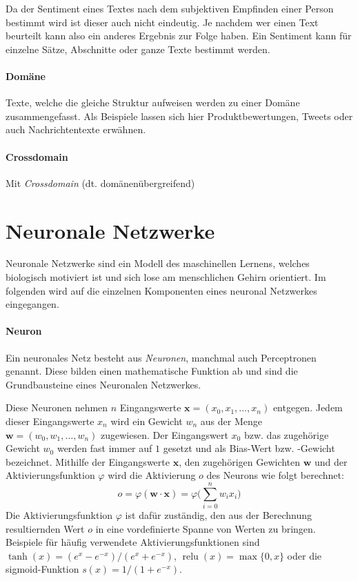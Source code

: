 Da der Sentiment eines Textes nach dem subjektiven Empfinden einer Person bestimmt wird ist dieser auch nicht eindeutig. Je nachdem wer einen Text beurteilt kann also ein anderes Ergebnis zur Folge haben. Ein Sentiment kann für einzelne Sätze, Abschnitte oder ganze Texte bestimmt werden.


\paragraph{Domäne} Texte, welche die gleiche Struktur aufweisen werden zu einer Domäne zusammengefasst. Als Beispiele lassen sich hier Produktbewertungen, Tweets oder auch Nachrichtentexte erwähnen.

\paragraph{Crossdomain} 
Mit \emph{Crossdomain} (dt. domänenübergreifend) 

\section{Neuronale Netzwerke}
\label{basics:neural_network}

Neuronale Netzwerke sind ein Modell des maschinellen Lernens, welches biologisch motiviert ist und sich lose am menschlichen Gehirn orientiert. Im folgenden wird auf die einzelnen Komponenten eines neuronal Netzwerkes eingegangen.

\paragraph{Neuron}\label{basic:neural_network:neuron} Ein neuronales Netz besteht aus \emph{Neuronen}, manchmal auch Perceptronen genannt. Diese bilden einen mathematische Funktion ab und sind die Grundbausteine eines Neuronalen Netzwerkes.

Diese Neuronen nehmen $n$ Eingangswerte $\mathbf{x} = (x_0, x_1, \dots, x_n)$ entgegen. Jedem dieser Eingangswerte $x_n$ wird ein Gewicht $w_n$ aus der Menge $\mathbf{w} = (w_0, w_1, \dots, w_n)$ zugewiesen. Der Eingangswert $x_0$ bzw. das zugehörige Gewicht $w_0$ werden fast immer auf $1$ gesetzt und als Bias-Wert bzw. -Gewicht bezeichnet. Mithilfe der Eingangswerte $\mathbf{x}$, den zugehörigen Gewichten $\mathbf{w}$ und der Aktivierungsfunktion $\varphi$ wird die Aktivierung $o$ des Neurons wie folgt berechnet:
\begin{equation}
o = \varphi(\mathbf{w} \cdot \mathbf{x}) = \varphi\bigg(\sum_{i=0}^{n} w_i x_i\bigg)
\label{basics:neural_network:compute_equation}
\end{equation}
Die Aktivierungsfunktion $\varphi$ ist dafür zuständig, den aus der Berechnung resultiernden Wert $o$ in eine vordefinierte Spanne von Werten zu bringen. Beispiele für häufig verwendete Aktivierungsfunktionen sind $\tanh(x) = (e^x - e^{-x})/(e^x + e^{-x})$, $\operatorname{relu}(x) = \max\{0,x\}$ oder die sigmoid-Funktion $s(x) = 1/(1 + e^{-x})$.
